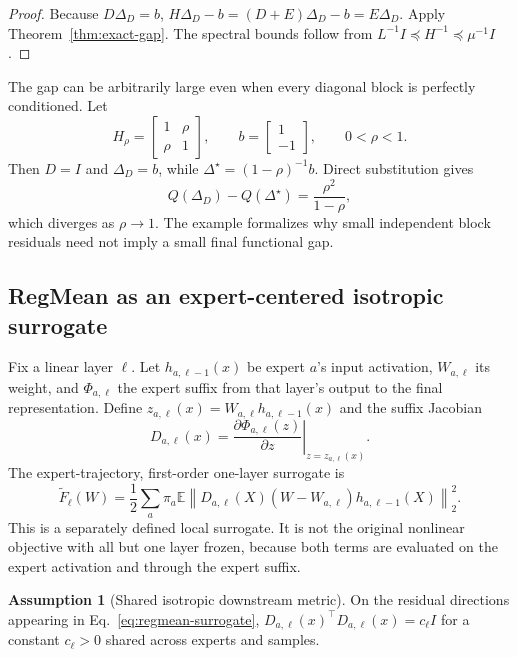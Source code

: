\documentclass[letterpaper]{article} %
\theoremstyle{plain}
\theoremstyle{definition}
\newtheorem{assumption}[theorem]{Assumption}
\begin{document}
\begin{proof}
Because $D\Delta_D=b$,
$H\Delta_D-b=(D+E)\Delta_D-b=E\Delta_D$. Apply
Theorem~\ref{thm:exact-gap}. The spectral bounds follow from
$L^{-1}I\preceq H^{-1}\preceq\mu^{-1}I$.
\end{proof}

The gap can be arbitrarily large even when every diagonal block is perfectly conditioned.
Let
\[
H_\rho=\begin{bmatrix}1&\rho\\ \rho&1\end{bmatrix},
\qquad
b=\begin{bmatrix}1\\-1\end{bmatrix},
\qquad 0<\rho<1.
\]
Then $D=I$ and $\Delta_D=b$, while
$\Delta^\star=(1-\rho)^{-1}b$. Direct substitution gives
\begin{equation}
Q(\Delta_D)-Q(\Delta^\star)=\frac{\rho^2}{1-\rho},
\label{eq:cross-layer-example}
\end{equation}
which diverges as $\rho\to1$. The example formalizes why small independent block
residuals need not imply a small final functional gap.

\subsection{RegMean as an expert-centered isotropic surrogate}
\label{app:regmean-proof}

Fix a linear layer $\ell$. Let $h_{a,\ell-1}(x)$ be expert $a$'s input activation,
$W_{a,\ell}$ its weight, and $\Phi_{a,\ell}$ the expert suffix from that layer's output to
the final representation. Define
$z_{a,\ell}(x)=W_{a,\ell}h_{a,\ell-1}(x)$ and the suffix Jacobian
\[
D_{a,\ell}(x)=
\left.\frac{\partial\Phi_{a,\ell}(z)}{\partial z}
\right|_{z=z_{a,\ell}(x)}.
\]
The expert-trajectory, first-order one-layer surrogate is
\begin{equation}
\widetilde F_\ell(W)=
\frac12\sum_a\pi_a\mathbb E
\left\|
D_{a,\ell}(X)(W-W_{a,\ell})h_{a,\ell-1}(X)
\right\|_2^2.
\label{eq:regmean-surrogate}
\end{equation}
This is a separately defined local surrogate. It is not the original nonlinear objective
with all but one layer frozen, because both terms are evaluated on the expert activation
and through the expert suffix.

\begin{assumption}[Shared isotropic downstream metric]
\label{ass:isotropic}
On the residual directions appearing in Eq.~\eqref{eq:regmean-surrogate},
$D_{a,\ell}(x)^\top D_{a,\ell}(x)=c_\ell I$ for a constant $c_\ell>0$ shared across
experts and samples.
\end{assumption}
\end{document}

